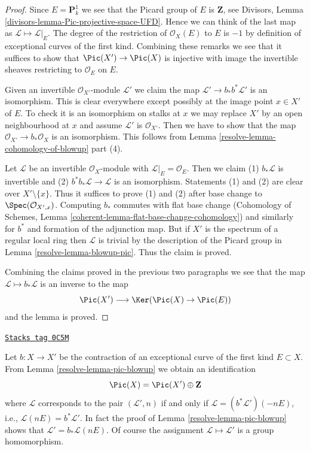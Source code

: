 \begin{proof}

Since $E = \mathbf{P}^1_k$ we see that the Picard group of $E$
is $\mathbf{Z}$, see Divisors, Lemma
\ref{divisors-lemma-Pic-projective-space-UFD}.
Hence we can think of the last map as $\mathcal{L} \mapsto \mathcal{L}|_E$.
The degree of the restriction of $\mathcal{O}_X(E)$ to $E$ is $-1$
by definition of exceptional curves of the first kind. Combining these
remarks we see that it
suffices to show that $\Pic(X') \to \Pic(X)$ is injective
with image the invertible sheaves restricting to $\mathcal{O}_E$ on $E$.

\medskip\noindent
Given an invertible $\mathcal{O}_{X'}$-module
$\mathcal{L}'$ we claim the map $\mathcal{L}' \to b_*b^*\mathcal{L}'$
is an isomorphism. This is clear everywhere except possibly at the image
point $x \in X'$ of $E$. To check it is an isomorphism on stalks
at $x$ we may replace $X'$ by an open neighbourhood at $x$ and
assume $\mathcal{L}'$ is $\mathcal{O}_{X'}$. Then we have to
show that the map $\mathcal{O}_{X'} \to b_*\mathcal{O}_X$
is an isomorphism. This follows from Lemma \ref{resolve-lemma-cohomology-of-blowup}
part (4).

\medskip\noindent
Let $\mathcal{L}$ be an invertible $\mathcal{O}_X$-module with
$\mathcal{L}|_E = \mathcal{O}_E$. Then we claim
(1) $b_*\mathcal{L}$ is invertible and
(2) $b^*b_*\mathcal{L} \to \mathcal{L}$ is an isomorphism.
Statements (1) and (2) are clear over $X' \setminus \{x\}$.
Thus it suffices to prove (1) and (2) after base change
to $\Spec(\mathcal{O}_{X', x})$.
Computing $b_*$ commutes with flat base change
(Cohomology of Schemes, Lemma \ref{coherent-lemma-flat-base-change-cohomology})
and similarly for $b^*$ and formation of the adjunction map.
But if $X'$ is the spectrum of a regular local ring
then $\mathcal{L}$ is trivial by the description of
the Picard group in Lemma \ref{resolve-lemma-blowup-pic}. Thus
the claim is proved.

\medskip\noindent
Combining the claims proved in the previous two paragraphs we
see that the map $\mathcal{L} \mapsto b_*\mathcal{L}$
is an inverse to the map
$$
\Pic(X') \longrightarrow \Ker(\Pic(X) \to \Pic(E))
$$
and the lemma is proved.
\end{proof}

\begin{remark}
\label{resolve-remark-pic-blowup}
\href{https://stacks.math.columbia.edu/tag/0C5M}{\texttt{Stacks tag 0C5M}}

Let $b : X \to X'$ be the contraction of an
exceptional curve of the first kind $E \subset X$.
From Lemma \ref{resolve-lemma-pic-blowup} we obtain an identification
$$
\Pic(X) = \Pic(X') \oplus \mathbf{Z}
$$
where $\mathcal{L}$ corresponds to the pair $(\mathcal{L}', n)$ if and only if
$\mathcal{L} = (b^*\mathcal{L}')(-nE)$, i.e.,
$\mathcal{L}(nE) = b^*\mathcal{L}'$. In fact the proof of
Lemma \ref{resolve-lemma-pic-blowup} shows that $\mathcal{L}' = b_*\mathcal{L}(nE)$.
Of course the assignment $\mathcal{L} \mapsto \mathcal{L}'$ is
a group homomorphism.
\end{remark}

